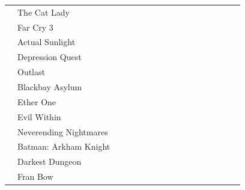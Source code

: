 \documentclass[twoside]{urjc-tfg}
\begin{document}
\begin{landscape}
\begin{longtable}{l  l  *{15}{c} }
                      & The Cat Lady	      	     &      &      &        &       &                      &                   &                   &                   &                   \\
                      & Far Cry 3	      	     &      &      &        &       &                      &                   &                   &                   &                   \\
                      & Actual Sunlight	             &      &      &        &       &                      &                   &                   &                   &                   \\
                      & Depression Quest	     &      &      &        &       &                      &                   &                   &                   &                   \\
                      & Outlast			     &      &      &        &       &                      &                   &                   &                   &                   \\
                      & Blackbay Asylum		     &      &      &        &       &                      &                   &                   &                   &                   \\
                      & Ether One		     &      &      &        &       &                      &                   &                   &                   &                   \\
                      & Evil Within		     &      &      &        &       &                      &                   &                   &                   &                   \\
                      & Neverending Nightmares	     &      &      &        &       &                      &                   &                   &                   &                   \\
                      & Batman: Arkham Knight	     &      &      &        &       &                      &                   &                   &                   &                   \\
                      & Darkest Dungeon		     &      &      &        &       &                      &                   &                   &                   &                   \\
                      & Fran Bow		     &      &      &        &       &                      &                   &                   &                   &                   \\

\end{longtable}
\end{landscape}
\end{document}
